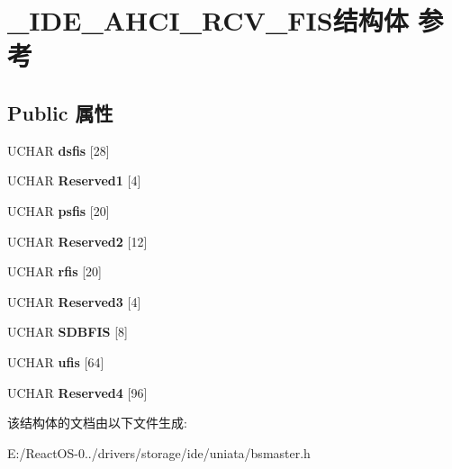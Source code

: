 \hypertarget{struct___i_d_e___a_h_c_i___r_c_v___f_i_s}{}\section{\+\_\+\+I\+D\+E\+\_\+\+A\+H\+C\+I\+\_\+\+R\+C\+V\+\_\+\+F\+I\+S结构体 参考}
\label{struct___i_d_e___a_h_c_i___r_c_v___f_i_s}
\subsection*{Public 属性}
\begin{DoxyCompactItemize}
\item 
\mbox{\label{struct___i_d_e___a_h_c_i___r_c_v___f_i_s_a0d05652b7167c41d5ea3a86d7ebfd67c}} 
U\+C\+H\+AR {\bfseries dsfis} \mbox{[}28\mbox{]}
\item 
\mbox{\label{struct___i_d_e___a_h_c_i___r_c_v___f_i_s_ad2f7c3816960ff0aa4b2016a44ffb3a6}} 
U\+C\+H\+AR {\bfseries Reserved1} \mbox{[}4\mbox{]}
\item 
\mbox{\label{struct___i_d_e___a_h_c_i___r_c_v___f_i_s_ad93fa3ec303ec4952ace28158de7cc08}} 
U\+C\+H\+AR {\bfseries psfis} \mbox{[}20\mbox{]}
\item 
\mbox{\label{struct___i_d_e___a_h_c_i___r_c_v___f_i_s_a6d1db2862ae1a1ad958315091beac6fd}} 
U\+C\+H\+AR {\bfseries Reserved2} \mbox{[}12\mbox{]}
\item 
\mbox{\label{struct___i_d_e___a_h_c_i___r_c_v___f_i_s_a25e5050bc266f97891d938b978637614}} 
U\+C\+H\+AR {\bfseries rfis} \mbox{[}20\mbox{]}
\item 
\mbox{\label{struct___i_d_e___a_h_c_i___r_c_v___f_i_s_afbe05ffbf4b8a894a44133893e860949}} 
U\+C\+H\+AR {\bfseries Reserved3} \mbox{[}4\mbox{]}
\item 
\mbox{\label{struct___i_d_e___a_h_c_i___r_c_v___f_i_s_a75e8e325ca85a1da870345741a6a5902}} 
U\+C\+H\+AR {\bfseries S\+D\+B\+F\+IS} \mbox{[}8\mbox{]}
\item 
\mbox{\label{struct___i_d_e___a_h_c_i___r_c_v___f_i_s_ace3d5b3d93938ca3e30d93f96143f838}} 
U\+C\+H\+AR {\bfseries ufis} \mbox{[}64\mbox{]}
\item 
\mbox{\label{struct___i_d_e___a_h_c_i___r_c_v___f_i_s_a1116a3d6fab3ba13aafab742387e401e}} 
U\+C\+H\+AR {\bfseries Reserved4} \mbox{[}96\mbox{]}
\end{DoxyCompactItemize}


该结构体的文档由以下文件生成\+:\begin{DoxyCompactItemize}
\item 
E\+:/\+React\+O\+S-\/0../drivers/storage/ide/uniata/bsmaster.\+h\end{DoxyCompactItemize}
